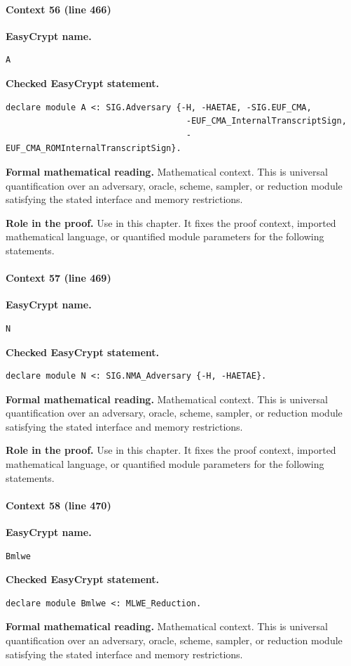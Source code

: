 \paragraph{Context 56 (line 466)}
\noindent\textbf{EasyCrypt name.}
\begin{lstlisting}[language=EasyCrypt,basicstyle=\ttfamily\scriptsize]
A
\end{lstlisting}
\noindent\textbf{Checked EasyCrypt statement.}
\begin{lstlisting}[language=EasyCrypt,basicstyle=\ttfamily\scriptsize]
declare module A <: SIG.Adversary {-H, -HAETAE, -SIG.EUF_CMA,
                                    -EUF_CMA_InternalTranscriptSign,
                                    -EUF_CMA_ROMInternalTranscriptSign}.
\end{lstlisting}
\noindent\textbf{Formal mathematical reading.}
Mathematical context. This is universal quantification over an adversary, oracle, scheme, sampler, or reduction module satisfying the stated interface and memory restrictions.

\noindent\textbf{Role in the proof.}
Use in this chapter. It fixes the proof context, imported mathematical language, or quantified module parameters for the following statements.

\paragraph{Context 57 (line 469)}
\noindent\textbf{EasyCrypt name.}
\begin{lstlisting}[language=EasyCrypt,basicstyle=\ttfamily\scriptsize]
N
\end{lstlisting}
\noindent\textbf{Checked EasyCrypt statement.}
\begin{lstlisting}[language=EasyCrypt,basicstyle=\ttfamily\scriptsize]
declare module N <: SIG.NMA_Adversary {-H, -HAETAE}.
\end{lstlisting}
\noindent\textbf{Formal mathematical reading.}
Mathematical context. This is universal quantification over an adversary, oracle, scheme, sampler, or reduction module satisfying the stated interface and memory restrictions.

\noindent\textbf{Role in the proof.}
Use in this chapter. It fixes the proof context, imported mathematical language, or quantified module parameters for the following statements.

\paragraph{Context 58 (line 470)}
\noindent\textbf{EasyCrypt name.}
\begin{lstlisting}[language=EasyCrypt,basicstyle=\ttfamily\scriptsize]
Bmlwe
\end{lstlisting}
\noindent\textbf{Checked EasyCrypt statement.}
\begin{lstlisting}[language=EasyCrypt,basicstyle=\ttfamily\scriptsize]
declare module Bmlwe <: MLWE_Reduction.
\end{lstlisting}
\noindent\textbf{Formal mathematical reading.}
Mathematical context. This is universal quantification over an adversary, oracle, scheme, sampler, or reduction module satisfying the stated interface and memory restrictions.


